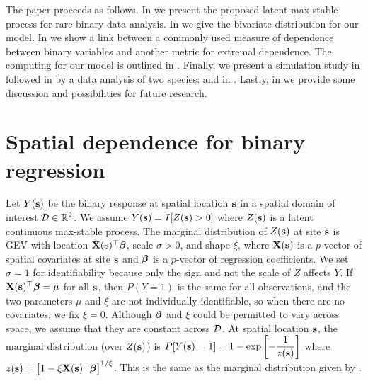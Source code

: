 \documentclass[11pt]{article}
\begin{document}
The paper proceeds as follows.
In  we present the proposed latent max-stable process for rare binary data analysis.
In  we give the bivariate distribution for our model.
In  we show a link between a commonly used measure of dependence between binary variables and another metric for extremal dependence.
The computing for our model is outlined in .
Finally, we present a simulation study in  followed in  by a data analysis of two species: \tamarix{} and \hedysarum{} in .
Lastly, in  we provide some discussion and possibilities for future research.

\section{Spatial dependence for binary regression} \label{rbs:maxstab}

Let $Y(\mbox{\bf s})$ be the binary response at spatial location $\mbox{\bf s}$ in a spatial domain of interest ${\cal D} \in \mathbb{R}^2$.
We assume $Y(\mbox{\bf s}) = I[Z(\mbox{\bf s}) > 0]$ where $Z(\mbox{\bf s})$ is a latent continuous max-stable process.
The marginal distribution of $Z(\mbox{\bf s})$ at site $\mbox{\bf s}$ is GEV with location $\mbox{\bf X}(\mbox{\bf s})^\top \mbox{\boldmath $\beta$}$, scale $\sigma > 0$, and shape $\xi$, where $\mbox{\bf X}(\mbox{\bf s})$ is a $p$-vector of spatial covariates at site $\mbox{\bf s}$ and $\mbox{\boldmath $\beta$}$ is a $p$-vector of regression coefficients.
We set $\sigma = 1$ for identifiability because only the sign and not the scale of $Z$ affects $Y$.
If $\mbox{\bf X}(\mbox{\bf s})^\top \mbox{\boldmath $\beta$} = \mu$ for all $\mbox{\bf s}$, then $P(Y = 1)$ is the same for all observations, and the two parameters $\mu$ and $\xi$ are not individually identifiable, so when there are no covariates, we fix $\xi = 0$.
Although $\mbox{\boldmath $\beta$}$ and $\xi$ could be permitted to vary across space, we assume that they are constant across ${\cal D}$.
At spatial location $\mbox{\bf s}$, the marginal distribution (over $Z(\mbox{\bf s})$) is \mbox{$P[Y(\mbox{\bf s}) = 1] = 1 - \exp\left[ -\displaystyle\frac{ 1 }{ z(\mbox{\bf s})} \right]$} where $z(\mbox{\bf s}) = \left[1 - \xi \mbox{\bf X}(\mbox{\bf s})^\top \mbox{\boldmath $\beta$}\right]^{1 / \xi}$.
This is the same as the marginal distribution given by \citet{Wang2010}.
\end{document}
